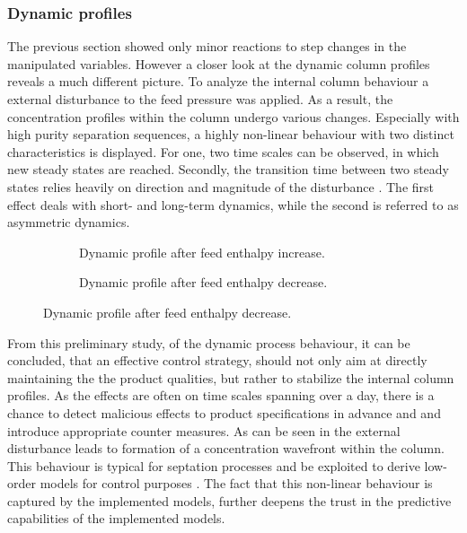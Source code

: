         \subsubsection{Dynamic profiles}
            The previous section showed only minor reactions to step changes in the manipulated variables. However
            a closer look at the dynamic column profiles reveals a much different picture. To analyze the internal
            column behaviour a external disturbance to the feed pressure was applied. As a result, the concentration
            profiles within the column undergo various changes. Especially with high purity separation sequences,
            a highly non-linear behaviour with two distinct characteristics is displayed. For one, two time scales can
            be observed, in which new steady states are reached. Secondly, the transition time
            between two steady states relies heavily on direction and magnitude of the disturbance \cite{Hwang.1991}.
            The first effect deals with short- and long-term dynamics, while the second is referred to as asymmetric dynamics.

            \begin{figure}
                \scriptsize
                \center
                \begin{subfigure}{0.48\textwidth}
                    
                    \caption{Dynamic profile after feed enthalpy increase.}
                    \label{fig:N2_ADyn_plus}
                \end{subfigure}
                    \begin{subfigure}{0.48\textwidth}
                    
                    \caption{Dynamic profile after feed enthalpy decrease.}
                    \label{fig:N2_ADyn_minus}
                \end{subfigure}
            \end{figure}

            From this preliminary study, of the dynamic process behaviour, it can be concluded, that an effective control strategy,
            should not only aim at directly maintaining the the product qualities, but rather to stabilize the internal column
            profiles. As the effects are often on time scales spanning over a day, there is a chance to detect malicious effects to
            product specifications in advance and and introduce appropriate counter measures. As can be seen in 
            the external disturbance leads to formation of a concentration wavefront within the column. This behaviour is typical 
            for septation processes and be exploited to derive low-order models for control purposes \cite{Marquardt.1988}. 
            The fact that this non-linear behaviour is captured by the implemented models, further deepens the trust in the predictive
            capabilities of the implemented models. 






